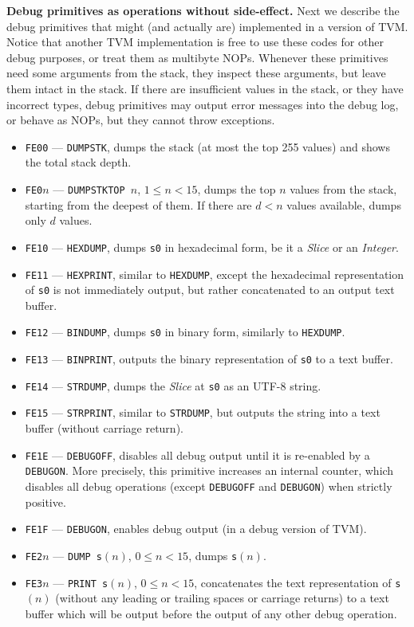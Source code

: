 \documentclass[12pt,oneside]{article}
\def\makepoint#1{\medbreak\noindent{\bf #1.\ }}
\def\nxsubpoint{\refstepcounter{subsubsection}%
    \smallbreak\makepoint{\thesubsubsection}}
\def\emb#1{\textbf{#1.}}
\begin{document}
\nxsubpoint\emb{Debug primitives as operations without side-effect}
Next we describe the debug primitives that might (and actually are) implemented in a version of TVM. Notice that another TVM implementation is free to use these codes for other debug purposes, or treat them as multibyte NOPs. Whenever these primitives need some arguments from the stack, they inspect these arguments, but leave them intact in the stack. If there are insufficient values in the stack, or they have incorrect types, debug primitives may output error messages into the debug log, or behave as NOPs, but they cannot throw exceptions.
\begin{itemize}
\item {\tt FE00} --- {\tt DUMPSTK}, dumps the stack (at most the top 255 values) and shows the total stack depth.
\item {\tt FE0$n$} --- {\tt DUMPSTKTOP $n$}, $1\leq n<15$, dumps the top $n$ values from the stack, starting from the deepest of them. If there are $d<n$ values available, dumps only $d$ values.
\item {\tt FE10} --- {\tt HEXDUMP}, dumps {\tt s0} in hexadecimal form, be it a {\em Slice} or an {\em Integer}.
\item {\tt FE11} --- {\tt HEXPRINT}, similar to {\tt HEXDUMP}, except the hexadecimal representation of {\tt s0} is not immediately output, but rather concatenated to an output text buffer.
\item {\tt FE12} --- {\tt BINDUMP}, dumps {\tt s0} in binary form, similarly to {\tt HEXDUMP}.
\item {\tt FE13} --- {\tt BINPRINT}, outputs the binary representation of {\tt s0} to a text buffer.
\item {\tt FE14} --- {\tt STRDUMP}, dumps the {\em Slice} at {\tt s0} as an UTF-8 string.
\item {\tt FE15} --- {\tt STRPRINT}, similar to {\tt STRDUMP}, but outputs the string into a text buffer (without carriage return).
\item {\tt FE1E} --- {\tt DEBUGOFF}, disables all debug output until it is re-enabled by a {\tt DEBUGON}. More precisely, this primitive increases an internal counter, which disables all debug operations (except {\tt DEBUGOFF} and {\tt DEBUGON}) when strictly positive.
\item {\tt FE1F} --- {\tt DEBUGON}, enables debug output (in a debug version of TVM).
\item {\tt FE2$n$} --- {\tt DUMP s$(n)$}, $0\leq n<15$, dumps {\tt s}$(n)$.
\item {\tt FE3$n$} --- {\tt PRINT s$(n)$}, $0\leq n<15$, concatenates the text representation of {\tt s}$(n)$ (without any leading or trailing spaces or carriage returns) to a text buffer which will be output before the output of any other debug operation.

\end{itemize}
\end{document}
